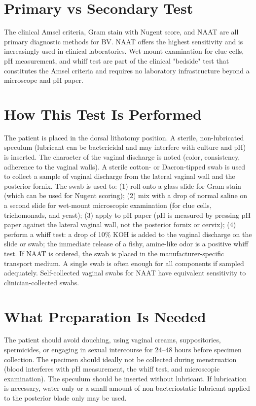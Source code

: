 \section*{Primary vs Secondary Test}
The clinical Amsel criteria, Gram stain with Nugent score, and NAAT are all primary diagnostic methods for BV. NAAT offers the highest sensitivity and is increasingly used in clinical laboratories. Wet-mount examination for clue cells, pH measurement, and whiff test are part of the clinical "bedside" test that constitutes the Amsel criteria and requires no laboratory infrastructure beyond a microscope and pH paper.

\section*{How This Test Is Performed}
The patient is placed in the dorsal lithotomy position. A sterile, non-lubricated speculum (lubricant can be bactericidal and may interfere with culture and pH) is inserted. The character of the vaginal discharge is noted (color, consistency, adherence to the vaginal walls). A sterile cotton- or Dacron-tipped swab is used to collect a sample of vaginal discharge from the lateral vaginal wall and the posterior fornix. The swab is used to: (1) roll onto a glass slide for Gram stain (which can be used for Nugent scoring); (2) mix with a drop of normal saline on a second slide for wet-mount microscopic examination (for clue cells, trichomonads, and yeast); (3) apply to pH paper (pH is measured by pressing pH paper against the lateral vaginal wall, not the posterior fornix or cervix); (4) perform a whiff test: a drop of 10\% KOH is added to the vaginal discharge on the slide or swab; the immediate release of a fishy, amine-like odor is a positive whiff test. If NAAT is ordered, the swab is placed in the manufacturer-specific transport medium. A single swab is often enough for all components if sampled adequately. Self-collected vaginal swabs for NAAT have equivalent sensitivity to clinician-collected swabs.

\section*{What Preparation Is Needed}
The patient should avoid douching, using vaginal creams, suppositories, spermicides, or engaging in sexual intercourse for 24--48 hours before specimen collection. The specimen should ideally not be collected during menstruation (blood interferes with pH measurement, the whiff test, and microscopic examination). The speculum should be inserted without lubricant. If lubrication is necessary, water only or a small amount of non-bacteriostatic lubricant applied to the posterior blade only may be used.

